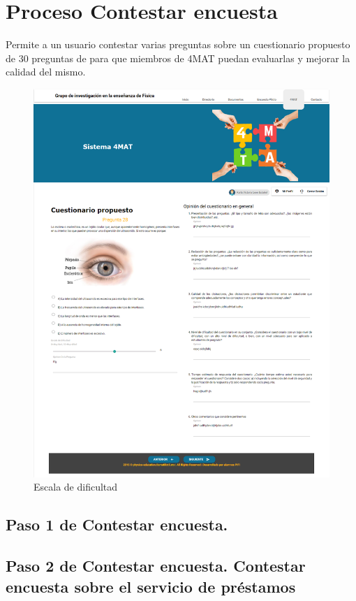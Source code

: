 \chapter{Proceso Contestar encuesta}
	Permite a un usuario contestar varias preguntas sobre un cuestionario 
	propuesto de 30 preguntas de para que miembros de 4MAT
	 puedan evaluarlas y   mejorar la calidad del mismo.


\begin{figure}[hbtp]
	\includegraphics[scale=0.3]{images/Interfaz/IUGS-14encuesta.png}
	\caption{Escala de dificultad}
	\end{figure}

\section{Paso 1 de Contestar encuesta.}
	

\section{Paso 2 de Contestar encuesta.
	Contestar encuesta sobre el servicio de préstamos}
	
